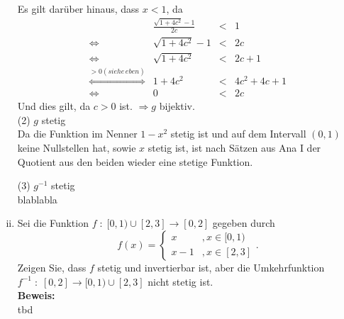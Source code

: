 \begin{enumerate}[(i)]
		Es gilt darüber hinaus, dass $x < 1$, da
		$$\begin{array}{crcl}
			& \frac{\sqrt{1+4c^2} -1}{2c} &<& 1\\
			\Leftrightarrow & \sqrt{1+4c^2} -1 &<& 2c\\
			\Leftrightarrow & \sqrt{1+4c^2} &<& 2c +1\\
			\stackrel{>0 (siehe \, eben)}\Leftrightarrow &
				 1 + 4c^2 &<& 4c^2 + 4c + 1\\
			\Leftrightarrow & 0 & < & 2c
		\end{array}$$
		Und dies gilt, da $c > 0$ ist.
                $\Rightarrow g$ bijektiv. \\

        (2) $g$ stetig \\
            Da die Funktion im Nenner $1-x^2$ stetig ist und auf dem Intervall $(0,1)$ keine Nullstellen hat, sowie $x$ stetig ist,
	ist nach Sätzen aus Ana I der Quotient aus den beiden wieder eine stetige Funktion.

        (3) $g^{-1}$ stetig\\
            blablabla
    
    \item Sei die Funktion $f \; : \; [0,1) \cup [2,3] \rightarrow [0,2]$ gegeben durch
        $$
            f(x) = \left\{ \begin{array}{lr}
                x &, x\in [0,1)\\
                x-1 &, x \in [2,3]
            \end{array} \right. .
        $$
        Zeigen Sie, dass $f$ stetig und invertierbar ist, aber die Umkehrfunktion 
        $f^{-1} \; : \; [0,2] \rightarrow [0,1) \cup [2,3]$ nicht stetig ist.\\

    \textbf{Beweis:}\\
        tbd
\end{enumerate}
